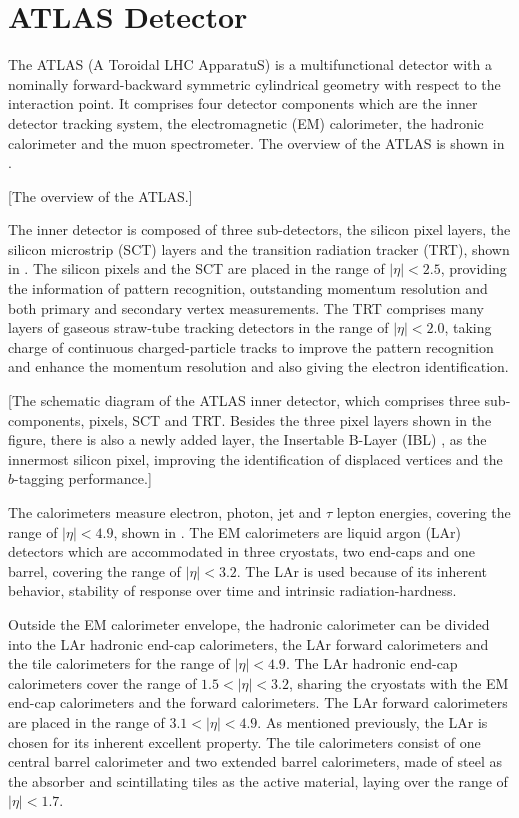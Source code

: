 \documentclass[class=NTHU_thesis, crop=false]{standalone}
\begin{document}
\chapter{ATLAS Detector}
\label{chap:ATLAS_Detector}
The ATLAS (A Toroidal LHC ApparatuS) \cite{1748-0221-3-08-S08003} is a multifunctional detector with a nominally forward-backward symmetric cylindrical geometry with respect to the interaction point. It comprises four detector components which are the inner detector tracking system, the electromagnetic (EM) calorimeter, the hadronic calorimeter and the muon spectrometer. The overview of the ATLAS is shown in .

[The overview of the ATLAS.]

The inner detector is composed of three sub-detectors, the silicon pixel layers, the silicon microstrip (SCT) layers and the transition radiation tracker (TRT), shown in . The silicon pixels and the SCT are placed in the range of $\left|\eta\right| < 2.5$, providing the information of pattern recognition, outstanding momentum resolution and both primary and secondary vertex measurements. The TRT comprises many layers of gaseous straw-tube tracking detectors in the range of $\left|\eta\right| < 2.0$, taking charge of continuous charged-particle tracks to improve the pattern recognition and enhance the momentum resolution and also giving the electron identification.

[The schematic diagram of the ATLAS inner detector, which comprises three sub-components, pixels, SCT and TRT. Besides the three pixel layers shown in the figure, there is also a newly added layer, the Insertable B-Layer (IBL) \cite{Capeans:1291633} \cite{CERN-LHCC-2012-009}, as the innermost silicon pixel, improving the identification of displaced vertices and the $b$-tagging performance.]

The calorimeters measure electron, photon, jet and $\tau$ lepton energies, covering the range of $\left|\eta\right| < 4.9$, shown in . The EM calorimeters are liquid argon (LAr) detectors which are accommodated in three cryostats, two end-caps and one barrel, covering the range of $\left|\eta\right| < 3.2$. The LAr is used because of its inherent behavior, stability of response over time and intrinsic radiation-hardness.

Outside the EM calorimeter envelope, the hadronic calorimeter can be divided into the LAr hadronic end-cap calorimeters, the LAr forward calorimeters and the tile calorimeters for the range of $\left|\eta\right| < 4.9$. The LAr hadronic end-cap calorimeters cover the range of $1.5 < \left|\eta\right| < 3.2$, sharing the cryostats with the EM end-cap calorimeters and the forward calorimeters. The LAr forward calorimeters are placed in the range of $3.1 < \left|\eta\right| < 4.9$. As mentioned previously, the LAr is chosen for its inherent excellent property. The tile calorimeters consist of one central barrel calorimeter and two extended barrel calorimeters, made of steel as the absorber and scintillating tiles as the active material, laying over the range of $\left|\eta\right| < 1.7$.
\end{document}
